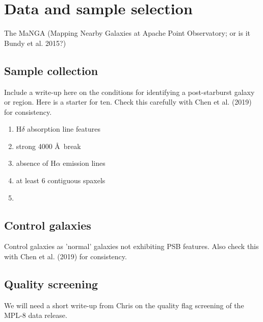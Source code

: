 \section{Data and sample selection}
\label{sec:sample}
The MaNGA (Mapping Nearby Galaxies at Apache Point Observatory; \cite{Bundy_2014} or is it Bundy et al. 2015?)
\subsection{Sample collection}
Include a write-up here on the conditions for identifying a post-starburst galaxy or region. Here is a starter for ten. Check this carefully with Chen et al. (2019) for consistency.
\begin{enumerate}
    \item H$\delta$ absorption line features
    \item strong 4000 \AA\ break 
    \item absence of H$\alpha$ emission lines
    \item at least 6 contiguous spaxels
    \item 
\end{enumerate}

\subsection{Control galaxies}
Control galaxies as 'normal' galaxies not exhibiting PSB features. Also check this with Chen et al. (2019) for consistency.

\subsection{Quality screening}
We will need a short write-up from Chris on the quality flag screening of the MPL-8 data release.

